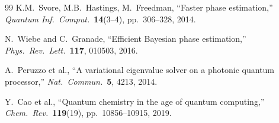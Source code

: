 \documentclass[12pt,a4paper]{article}
\begin{document}
\begin{thebibliography}{99}
K.M.\ Svore, M.B.\ Hastings, M.\ Freedman,
``Faster phase estimation,''
\textit{Quantum Inf.\ Comput.}\ \textbf{14}(3--4), pp.\ 306--328, 2014.

N.\ Wiebe and C.\ Granade,
``Efficient Bayesian phase estimation,''
\textit{Phys.\ Rev.\ Lett.}\ \textbf{117}, 010503, 2016.

A.\ Peruzzo et al.,
``A variational eigenvalue solver on a photonic quantum processor,''
\textit{Nat.\ Commun.}\ \textbf{5}, 4213, 2014.

Y.\ Cao et al.,
``Quantum chemistry in the age of quantum computing,''
\textit{Chem.\ Rev.}\ \textbf{119}(19), pp.\ 10856--10915, 2019.

\end{thebibliography}
\end{document}
